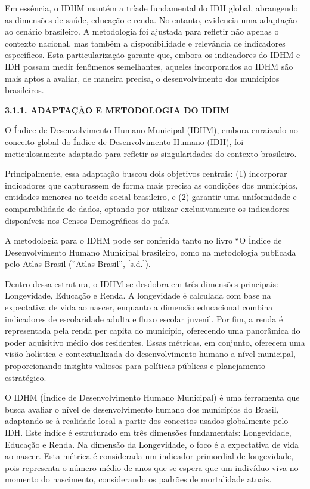 \documentclass[
]{article}
\begin{document}
Em essência, o IDHM mantém a tríade fundamental do IDH global,
abrangendo as dimensões de saúde, educação e renda. No entanto,
evidencia uma adaptação ao cenário brasileiro. A metodologia foi
ajustada para refletir não apenas o contexto nacional, mas também a
disponibilidade e relevância de indicadores específicos. Esta
particularização garante que, embora os indicadores do IDHM e IDH possam
medir fenômenos semelhantes, aqueles incorporados ao IDHM são mais aptos
a avaliar, de maneira precisa, o desenvolvimento dos municípios
brasileiros.

\textbf{3.1.1. ADAPTAÇÃO E METODOLOGIA DO IDHM}

O Índice de Desenvolvimento Humano Municipal (IDHM), embora enraizado no
conceito global do Índice de Desenvolvimento Humano (IDH), foi
meticulosamente adaptado para refletir as singularidades do contexto
brasileiro.

Principalmente, essa adaptação buscou dois objetivos centrais: (1)
incorporar indicadores que capturassem de forma mais precisa as
condições dos municípios, entidades menores no tecido social brasileiro,
e (2) garantir uma uniformidade e comparabilidade de dados, optando por
utilizar exclusivamente os indicadores disponíveis nos Censos
Demográficos do país.

A metodologia para o IDHM pode ser conferida tanto no livro ``O Índice
de Desenvolvimento Humano Municipal brasileiro, como na metodologia
publicada pelo Atlas Brasil (''Atlas Brasil'', {[}s.d.{]}).

Dentro dessa estrutura, o IDHM se desdobra em três dimensões principais:
Longevidade, Educação e Renda. A longevidade é calculada com base na
expectativa de vida ao nascer, enquanto a dimensão educacional combina
indicadores de escolaridade adulta e fluxo escolar juvenil. Por fim, a
renda é representada pela renda per capita do município, oferecendo uma
panorâmica do poder aquisitivo médio dos residentes. Essas métricas, em
conjunto, oferecem uma visão holística e contextualizada do
desenvolvimento humano a nível municipal, proporcionando insights
valiosos para políticas públicas e planejamento estratégico.

O IDHM (Índice de Desenvolvimento Humano Municipal) é uma ferramenta que
busca avaliar o nível de desenvolvimento humano dos municípios do
Brasil, adaptando-se à realidade local a partir dos conceitos usados
globalmente pelo IDH. Este índice é estruturado em três dimensões
fundamentais: Longevidade, Educação e Renda. Na dimensão da Longevidade,
o foco é a expectativa de vida ao nascer. Esta métrica é considerada um
indicador primordial de longevidade, pois representa o número médio de
anos que se espera que um indivíduo viva no momento do nascimento,
considerando os padrões de mortalidade atuais.
\end{document}
